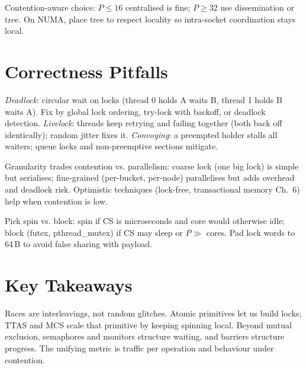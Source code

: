 Contention-aware choice: $P\le16$ centralised is fine; $P\ge32$ use dissemination or tree. On NUMA, place tree to respect locality so intra-socket coordination stays local.

\section{Correctness Pitfalls}\label{sec:pitfalls}
\emph{Deadlock}: circular wait on locks (thread 0 holds A waits B, thread 1 holds B waits A). Fix by global lock ordering, try-lock with backoff, or deadlock detection. \emph{Livelock}: threads keep retrying and failing together (both back off identically); random jitter fixes it. \emph{Convoying}: a preempted holder stalls all waiters; queue locks and non-preemptive sections mitigate.

Granularity trades contention vs. parallelism: coarse lock (one big lock) is simple but serialises; fine-grained (per-bucket, per-node) parallelises but adds overhead and deadlock risk. Optimistic techniques (lock-free, transactional memory Ch.~6) help when contention is low.

\begin{remark}[Checklist]
Pick spin vs. block: spin if CS is microseconds and core would otherwise idle; block (futex, pthread\_mutex) if CS may sleep or $P\gg$ cores. Pad lock words to 64\,B to avoid false sharing with payload.
\end{remark}

\section*{Key Takeaways}
Races are interleavings, not random glitches. Atomic primitives let us build locks; TTAS and MCS scale that primitive by keeping spinning local. Beyond mutual exclusion, semaphores and monitors structure waiting, and barriers structure progress. The unifying metric is traffic per operation and behaviour under contention.

